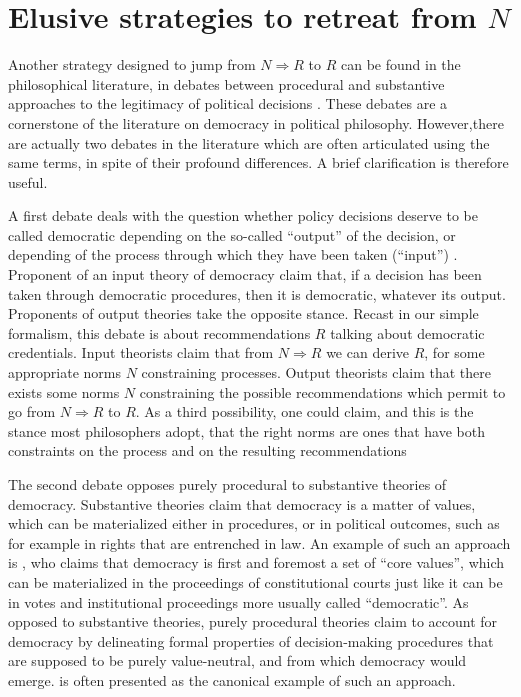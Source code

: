 \documentclass[preprint, french, english, 11pt, authoryear]{elsarticle}%
\begin{document}
\section{\texorpdfstring{Elusive strategies to retreat from $N$}{Elusive strategies to retreat from N}}
Another strategy designed to jump from $N ⇒ R$ to $R$ can be found in the philosophical literature, in debates between procedural and substantive approaches to the legitimacy of political decisions \cite{meinard_what_2017}. These debates are a cornerstone of the literature on democracy in political philosophy. However,there are actually two debates in the literature which are often articulated using the same terms, in spite of their profound differences. A brief clarification is therefore useful.

A first debate deals with the question whether policy decisions deserve to be called democratic depending on the so-called “output” of the decision, or depending of the process through which they have been taken (“input”) \cite{vatn_environmental_2016, backstrand_environmental_2010}. Proponent of an input theory of democracy claim that, if a decision has been taken through democratic procedures, then it is democratic, whatever its output. Proponents of output theories take the opposite stance. Recast in our simple formalism, this debate is about recommendations $R$ talking about democratic credentials. Input theorists claim that from $N ⇒ R$ we can derive $R$, for some appropriate norms $N$ constraining processes. Output theorists claim that there exists some norms $N$ constraining the possible recommendations which permit to go from $N ⇒ R$ to $R$. As a third possibility, one could claim, and this is the stance most philosophers adopt, that the right norms are ones that have both constraints on the process and on the resulting recommendations

The second debate opposes purely procedural to substantive theories of democracy. Substantive theories claim that democracy is a matter of values, which can be materialized either in procedures, or in political outcomes, such as for example in rights that are entrenched in law. An example of such an approach is \cite{brettschneider_value_2006}, who claims that democracy is first and foremost a set of ``core values'', which can be materialized in the proceedings of constitutional courts just like it can be in votes and institutional proceedings more usually called ``democratic''. As opposed to substantive theories, purely procedural theories claim to account for democracy by delineating formal properties of decision-making procedures that are supposed to be purely value-neutral, and from which democracy would emerge. \cite{habermas_faktizitat_1992} is often presented as the canonical example of such an approach. 
\end{document}
